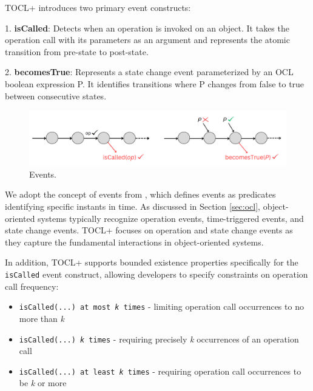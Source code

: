 TOCL+ introduces two primary event constructs:

1. \textbf{isCalled}: Detects when an operation is invoked on an object. It takes 
the operation call with its parameters as an argument and represents the atomic 
transition from pre-state to post-state.

2. \textbf{becomesTrue}: Represents a state change event parameterized by an OCL 
boolean expression P. It identifies transitions where P changes from false to true 
between consecutive states.

\begin{figure}[H]
    \centering
    \includegraphics[width=1\textwidth]{figures/c2/events_visual.png}
    \caption{Events.}
    \label{fig:event_constructs}
\end{figure}

We adopt the concept of events from \cite{TOCL_Taha}, which defines events 
as predicates identifying specific instants in time. As discussed in Section 
\ref{sec:ocl}, object-oriented systems typically recognize operation events, 
time-triggered events, and state change events. TOCL+ focuses on operation and 
state change events as they capture the fundamental interactions in object-oriented 
systems.

In addition, TOCL+ supports bounded existence properties specifically for the 
\texttt{isCalled} event construct, allowing developers to specify constraints on 
operation call frequency:
\begin{itemize}
    \item \texttt{isCalled(...) at most \textit{k} times} - limiting operation call occurrences to no more than \textit{k}
    \item \texttt{isCalled(...) \textit{k} times} - requiring precisely \textit{k} occurrences of an operation call
    \item \texttt{isCalled(...) at least \textit{k} times} - requiring operation call occurrences to be \textit{k} or more
\end{itemize}

